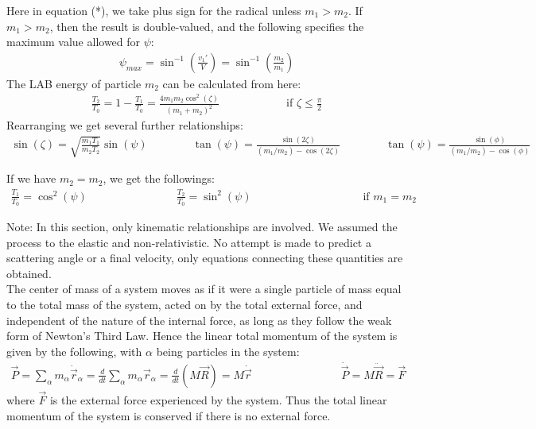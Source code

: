 \documentclass[11pt,oneside]{book}
\theoremstyle{break}
\theoremstyle{break}
\newcommand{\note}{\color{red}Note: \color{black}}
\begin{document}
Here in equation (*), we take plus sign for the radical unless $m_1>m_2$. If $m_1 > m_2$, then the result is double-valued, and the following specifies the maximum value allowed for $\psi$:
\begin{align*}
\psi_{max} = \sin^{-1}\left(\frac{v_1'}{V} \right)=\sin^{-1}\left(\frac{m_2}{m_1} \right)
\end{align*}
The LAB energy of particle $m_2$ can be calculated from here:
\begin{align*}
\frac{T_2}{T_0} = 1- \frac{T_1}{T_0} = \frac{4m_1m_2\cos^2(\zeta)}{(m_1+m_2)^2} \qquad\qquad\qquad \text{if }\zeta \leq \frac{\pi}{2}
\end{align*}
Rearranging we get several further relationships:
\begin{align*}
\sin(\zeta) = \sqrt{\frac{m_1T_1}{m_2T_2}} \sin(\psi) \qquad\qquad \tan(\psi) = \frac{\sin(2\zeta)}{(m_1/m_2) -\cos(2\zeta)}\qquad\qquad \tan(\psi) = \frac{\sin(\phi)}{(m_1/m_2) - \cos(\phi)}
\end{align*}

If we have $m_2 = m _2$, we get the followings:
\begin{align*}
\frac{T_1}{T_0} = \cos^2 (\psi) \qquad\qquad \qquad\qquad \frac{T_2}{T_0} = \sin^2(\psi) \qquad\qquad\qquad\qquad\qquad \text{if }m_1= m_2
\end{align*}

\note In this section, only kinematic relationships are involved. We assumed the process to the elastic and non-relativistic. No attempt is made to predict a scattering angle or a final velocity, only equations connecting these quantities are obtained.\\


The center of mass of a system moves as if it were a single particle of mass equal to the total mass of the system, acted on by the total external force, and independent of the nature of the internal force, as long as they follow the weak form of Newton's Third Law. Hence the linear total momentum of the system is given by the following, with $\alpha$ being particles in the system:
\begin{align*}
\vec{P} = \sum_\alpha m_\alpha \dot{\vec{r}}_\alpha = \frac{d}{dt}\sum_\alpha m_\alpha \vec{r}_\alpha = \frac{d}{dt} (M\vec{R}) = M\dot{\vec{r}}\qquad\qquad\qquad\qquad \dot{\vec{P}} = M\ddot{\vec{R}} = \vec{F}
\end{align*}
where $\vec{F}$ is the external force experienced by the system. Thus the total linear momentum of the system is conserved if there is no external force.\\
\end{document}
